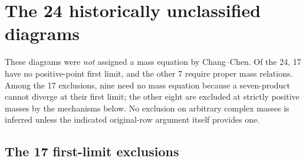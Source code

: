 \documentclass[11pt]{amsart}
\theoremstyle{remark}
\newcommand{\Needspace}[1]{\par\ifdim\dimexpr\pagegoal-\pagetotal\relax<#1\newpage\fi}
\begin{document}
\section{The 24 historically unclassified diagrams}\label{sec:historical-open}
These diagrams were \emph{not} assigned a mass equation by
Chang--Chen. Of the 24, 17 have no positive-point first limit,
and the other 7 require proper mass relations. Among the 17
exclusions, nine need no mass equation because a seven-product
cannot diverge at their first limit; the other eight are
excluded at strictly positive masses by the mechanisms below.
No exclusion on arbitrary complex masses is inferred unless the
indicated original-row argument itself provides one.

\Needspace{8\baselineskip}
\subsection*{The 17 first-limit exclusions}
\end{document}
